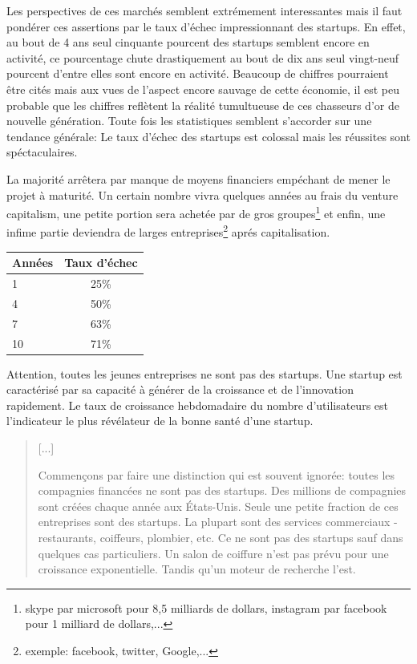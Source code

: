 \documentclass[11pt, a4paper ]{article}
\begin{document}
\begin{spacing}{1.5}
Les perspectives de ces marchés semblent extrémement interessantes mais il faut pondérer ces assertions par le taux d'échec impressionnant des startups. En effet, au bout de 4 ans seul cinquante pourcent des startups semblent encore en activité, ce pourcentage chute drastiquement au bout de dix ans seul vingt-neuf pourcent d'entre elles sont encore en activité.
Beaucoup de chiffres pourraient être cités mais aux vues de l'aspect encore sauvage de cette économie, il est peu probable que les chiffres reflètent la réalité tumultueuse de ces chasseurs d'or de nouvelle génération.
Toute fois les statistiques semblent s'accorder sur une tendance générale: Le taux d'échec des startups est colossal mais les réussites sont spéctaculaires.

La majorité arrêtera par manque de moyens financiers empéchant de mener le projet à maturité. Un certain nombre vivra quelques années au frais du venture capitalism, une petite portion sera achetée par de gros groupes\footnote{ skype par microsoft pour 8,5 milliards de dollars, instagram par facebook pour 1 milliard de dollars,... } et enfin, une infime partie deviendra de larges entreprises\footnote{exemple: facebook, twitter, Google,...} aprés capitalisation.

\begin{center}
	\begin{tabular}{l*{1}{c}}
		Années  & Taux d'échec\\
		\hline
		1 & 25\% \\
		4 & 50\% \\
		7 & 63\% \\
		10 & 71\% \\
	\end{tabular}\cite{statEchecStartup}
\end{center}

Attention, toutes les jeunes entreprises ne sont pas des startups. Une startup est caractérisé par sa capacité à générer de la croissance et de l'innovation rapidement. Le taux de croissance hebdomadaire du nombre d'utilisateurs est l'indicateur le plus révélateur de la bonne santé d'une startup.

\begin{quote}
	[...]

	Commençons par faire une distinction qui est souvent ignorée: toutes les compagnies financées ne sont pas des startups. Des millions de compagnies sont créées chaque année aux États-Unis. Seule une petite fraction de ces entreprises sont des startups. La plupart sont des services commerciaux - restaurants, coiffeurs, plombier, etc. Ce ne sont pas des startups sauf dans quelques cas particuliers. Un salon de coiffure n'est pas prévu pour une croissance exponentielle. Tandis qu'un moteur de recherche l'est.


\end{quote}
\end{spacing}
\end{document}
